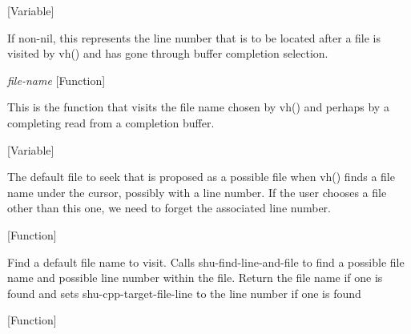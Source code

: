\vspace{1em}
\noindent
{}
\usebox{\funcname}
 \hfill [Variable]

\begin{doc-string}
If non-nil, this represents the line number that is to be located after a
file is visited by vh() and has gone through buffer completion selection.
\end{doc-string}

\vspace{1em}
\noindent
{}
\usebox{\funcname}\emph{file-name}
 \hfill [Function]

\begin{doc-string}
This is the function that visits the file name chosen by vh() and perhaps
by a completing read from a completion buffer.
\end{doc-string}

\vspace{1em}
\noindent
{}
\usebox{\funcname}
 \hfill [Variable]

\begin{doc-string}
The default file to seek that is proposed as a possible file when vh() finds a
file name under the cursor, possibly with a line number.  If the user chooses a
file other than this one, we need to forget the associated line number.
\end{doc-string}

\vspace{1em}
\noindent
{}
\usebox{\funcname}
 \hfill [Function]

\begin{doc-string}
Find a default file name to visit.  Calls shu-find-line-and-file to find a possible file
name and possible line number within the file.  Return the file name if one is found and
sets shu-cpp-target-file-line to the line number if one is found
\end{doc-string}

\vspace{1em}
\noindent
{}
\usebox{\funcname}
 \hfill [Function]

